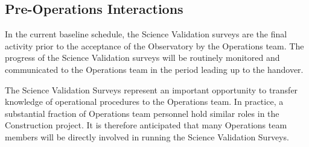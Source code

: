 \subsection{Pre-Operations Interactions}

In the current baseline schedule, the Science Validation surveys are the final activity prior to the acceptance of the Observatory by the Operations team.
The progress of the Science Validation surveys will be routinely monitored and communicated to the Operations team in the period leading up to the handover.

The Science Validation Surveys represent an important opportunity to transfer knowledge of operational procedures to the Operations team.
In practice, a substantial fraction of Operations team personnel hold similar roles in the Construction project.
It is therefore anticipated that many Operations team members will be directly involved in running the Science Validation Surveys.




